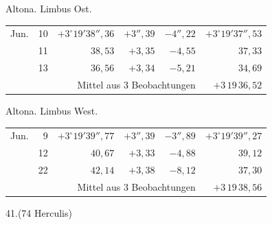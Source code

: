 \noindent\begin{minipage}[t]{.495\textwidth}\centering Altona. Limbus Ost.\par\smallskip
{\scriptsize\setlength{\tabcolsep}{1pt}\renewcommand{\arraystretch}{1.2}\begin{tabular}{lr|r|r|r|r|}
Jun.&10&$+3^\circ19'38''{,}36$&$+3''{,}39$&$-4''{,}22$&$+3^\circ19'37''{,}53$\\
&11&$38{,}53$&$+3{,}35$&$-4{,}55$&$37{,}33$\\
&13&$36{,}56$&$+3{,}34$&$-5{,}21$&$34{,}69$\\
\cline{6-6}\multicolumn{5}{r}{Mittel aus 3 Beobachtungen}&$+3\,19\,36{,}52$
\end{tabular}}\end{minipage}\hfill\begin{minipage}[t]{.495\textwidth}\centering Altona. Limbus West.\par\smallskip
{\scriptsize\setlength{\tabcolsep}{1pt}\renewcommand{\arraystretch}{1.2}\begin{tabular}{lr|r|r|r|r}
Jun.&9&$+3^\circ19'39''{,}77$&$+3''{,}39$&$-3''{,}89$&$+3^\circ19'39''{,}27$\\
&12&$40{,}67$&$+3{,}33$&$-4{,}88$&$39{,}12$\\
&22&$42{,}14$&$+3{,}38$&$-8{,}12$&$37{,}30$\\
\cline{6-6}\multicolumn{5}{r}{Mittel aus 3 Beobachtungen}&$+3\,19\,38{,}56$
\end{tabular}}\end{minipage}
\par\vspace{4mm}
\begin{center}41.\quad (74 Herculis)\end{center}

